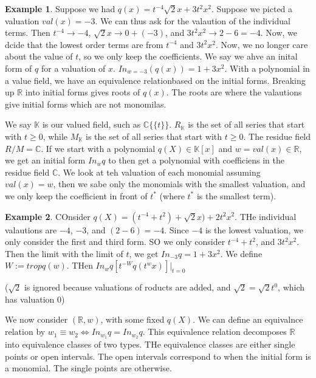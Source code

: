 \documentclass[12pt]{memoir}
\theoremstyle{definition}
\newtheorem{protoexample}{Example}[section]
\newenvironment{ex}
   {\begin{protoexample}}
   {\end{protoexample}}
\def\RR{{\mathbb R}}
\def\KK{{\mathbb K}}
\def\CC{{\mathbb C}}
\begin{document}
\begin{ex}
    Suppose we had $q(x) = t^{-4} \sqrt{2} x + 3t^2x^2$. Suppose we picted a valuation $val(x) = -3$. We can thus ask for the valaution of the individual terms. Then $t^{-4} \rightarrow -4$, $\sqrt{2}x \rightarrow 0+(-3)$, and $3t^2 x^2 \rightarrow 2-6= -4$. Now, we dcide that the lowest order terms are from $t^{-4}$ and $3t^2x^2$. Now, we no longer care about the value of $t$, so we only keep the coefficients. We say we ahve an inital form of $q$ for a valuation of $x$. $In_{w = -3} (q(x)) = 1+ 3x^2$. With a polynomial in a value field, we have an equivalence relationbased on the initial forms. Breaking up $\RR$ into initial forms gives roots of $q(x)$. The roots are where the valautions give initial forms which are not monomilas.
\end{ex}


We say $\KK$ is our valued field, such as $\CC\{\{t\}\}$. $R_\KK$ is the set of all series that start with $t \geq 0$, while $M_\KK$ is the set of all series that start with $t \geq 0$. The residue field $R/M = \CC$. If we start with a polynomial $q(X) \in \KK[x]$ and $w= val(x) \in \RR$, we get an initial form $In_w q$ to then get a polynomial with coefficiens in the residue field $\CC$. We look at teh valuation of each monomial assuming $val(x)=w$, then we sabe only the monomials with the smallest valuation, and we only keep the coefficient in front of $t^*$ (where $t^*$ is the smallest term).

\begin{ex}
    COnsider $q(X) = (t^{-4} + t^2) + \sqrt{2} x) + 2t^2x^2 $. THe individual valautions are $-4$, $-3$, and $(2-6)=-4$. Since $-4$ is the lowest valuation, we only consider the first and third form. SO we only consider $t^{-4}+t^2$, and $3t^2x^2$. Then the limit with the limit of $t$,  we get $In_{-3} q = 1 + 3x^2$. We define $W:=trop q(w)$. THen $In_w q [t^{-W} q(t^wx)] |_{t=0}$
\end{ex}


($\sqrt{2}$ is ignored because valuations of roducts are added, and $\sqrt{2}=\sqrt{2}t^0$, which has valuation $0$)


We now consider $(\RR,w)$, with some fixed $q(X)$. We can define an equivalnce relation by $w_1 \equiv w_2 \iff In_{w_1}q = In_{w_2}q$. This equivalence relation decomposes $\RR$ into equivalence classes of two types. THe equivalence classes are either single points or open intervals. The open intervals correspond to when the initial form is a monomial. The single points are otherwise.
\end{document}
